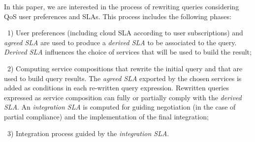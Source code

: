 In this paper, we are interested in the process of rewriting queries  considering QoS user preferences and SLAs.
This process includes the following phases: 
\begin{trivlist}
\item[~1)]  User preferences (including cloud SLA according to user subscriptions) and \textit{agreed SLA} are  used to produce a \textit{derived SLA} to be associated to the query. 
{\em Derived SLA}  influences the choice of services that will be used to build the result; 
\item[~2)] Computing service compositions that rewrite the initial query and that are used to  build query results. 
The \textit{agreed SLA} exported by the chosen services is added as conditions in  each re-written query expression. 
Rewritten queries expressed as service composition can fully or partially comply with the \textit{derived SLA}.  An \textit{integration SLA} is  computed for guiding  negotiation (in the case of partial compliance)  and the implementation of the final integration; 
\item[~3)]   Integration process guided by the \textit{integration SLA}.
\end{trivlist}
 


